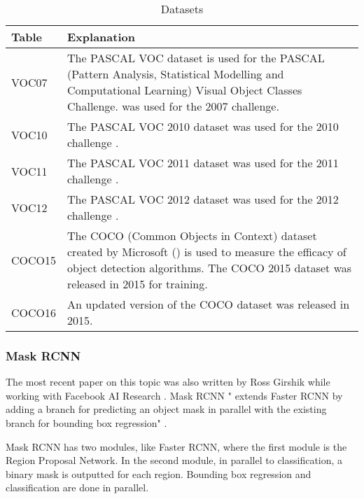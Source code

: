 \begin{table}[h]
\centering
\caption{Datasets}
\label{datasets}
\begin{tabular}{|p{2cm}|p{12cm}|}
\hline
\textbf{Table} & \textbf{Explanation}                                                                                                                                                                                               \\ \hline
VOC07          & The PASCAL VOC dataset is used for the PASCAL (Pattern Analysis, Statistical Modelling and Computational Learning) Visual Object Classes Challenge. \parencite{pascal-voc-2007} was used for the 2007 challenge. \\ \hline
VOC10          & The PASCAL VOC 2010 dataset was used for the 2010 challenge \parencite{pascal-voc-2010}.                                                                                                                         \\ \hline
VOC11          & The PASCAL VOC 2011 dataset was used for the 2011 challenge \parencite{pascal-voc-2011}.                                                                                                                        \\ \hline
VOC12          & The PASCAL VOC 2012 dataset was used for the 2012 challenge \parencite{pascal-voc-2012}.                                                                                                                        \\ \hline
COCO15         & The COCO (Common Objects in Context) dataset created by Microsoft (\parencite{coco}) is used to measure the efficacy of object detection algorithms. The COCO 2015 dataset was released in 2015 for training.    \\ \hline
COCO16         & An updated version of the COCO dataset was released in 2015.                                                                                                                                                       \\ \hline
\end{tabular}
\end{table}

\subsubsection*{Mask RCNN}
The most recent paper on this topic was also written by Ross Girshik while
working with Facebook AI Research \parencite{maskRcnn}. Mask RCNN " extends Faster
RCNN by adding a branch for predicting an object mask in parallel with the
existing branch for bounding box regression" \parencite{maskRcnn}.

Mask RCNN has two modules, like Faster RCNN, where the first module is the
Region Proposal Network. In the second module, in parallel to classification, a
binary mask is outputted for each region. Bounding box regression and
classification are done in parallel.

